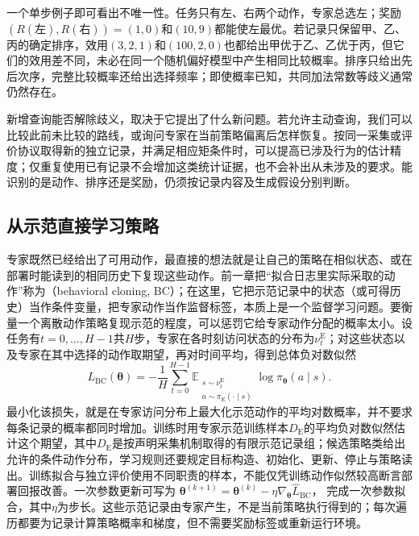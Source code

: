一个单步例子即可看出不唯一性。任务只有左、右两个动作，专家总选左；奖励$(R(\text{左}),R(\text{右}))=(1,0)$和$(10,9)$都能使左最优。若记录只保留甲、乙、丙的确定排序，效用$(3,2,1)$和$(100,2,0)$也都给出甲优于乙、乙优于丙，但它们的效用差不同，未必在同一个随机偏好模型中产生相同比较概率。排序只给出先后次序，完整比较概率还给出选择频率；即使概率已知，共同加法常数等歧义通常仍然存在。

新增查询能否解除歧义，取决于它提出了什么新问题。若允许主动查询，我们可以比较此前未比较的路线，或询问专家在当前策略偏离后怎样恢复。按同一采集或评价协议取得新的独立记录，并满足相应矩条件时，可以提高已涉及行为的估计精度；仅重复使用已有记录不会增加这类统计证据，也不会补出从未涉及的要求。能识别的是动作、排序还是奖励，仍须按记录内容及生成假设分别判断。

\subsection{从示范直接学习策略}
\label{sec:rl-reward-bc-dagger}

专家既然已经给出了可用动作，最直接的想法就是让自己的策略在相似状态、或在部署时能读到的相同历史下复现这些动作。前一章把“拟合日志里实际采取的动作”称为（behavioral cloning, BC）；在这里，它把示范记录中的状态（或可得历史）当作条件变量，把专家动作当作监督标签，本质上是一个监督学习问题。要衡量一个离散动作策略复现示范的程度，可以惩罚它给专家动作分配的概率太小。设任务有$t=0,\ldots,H-1$共$H$步，专家在各时刻访问状态的分布为$\nu_t^{\mathrm E}$；对这些状态以及专家在其中选择的动作取期望，再对时间平均，得到总体负对数似然
\begin{equation}
  L_{\mathrm{BC}}(\bm{\theta})
  =-\frac1H\sum_{t=0}^{H-1}
  \mathbb E_{\substack{s\sim\nu_t^{\mathrm E}\\
              a\sim\pi_{\mathrm E}(\cdot\mid s)}}
       \log\pi_{\bm{\theta}}(a\mid s).
  \label{eq:rl-reward-bc}
\end{equation}
最小化该损失，就是在专家访问分布上最大化示范动作的平均对数概率，并不要求每条记录的概率都同时增加。训练时用专家示范训练样本$D_{\mathrm E}$的平均负对数似然估计这个期望，其中$D_{\mathrm E}$是按声明采集机制取得的有限示范记录组；候选策略类给出允许的条件动作分布，学习规则还要规定目标构造、初始化、更新、停止与策略读出。训练拟合与独立评价使用不同职责的样本，不能仅凭训练动作似然较高断言部署回报改善。一次参数更新可写为
$\bm{\theta}^{(k+1)}=\bm{\theta}^{(k)}
-\eta\nabla_{\bm{\theta}}\widehat L_{\mathrm{BC}}$，
完成一次参数拟合，其中$\eta$为步长。这些示范记录由专家产生，不是当前策略执行得到的；每次遍历都要为记录计算策略概率和梯度，但不需要奖励标签或重新运行环境。

